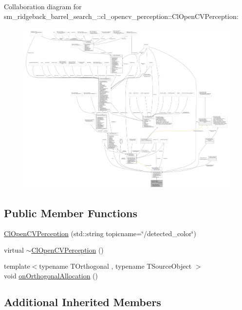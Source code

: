 Collaboration diagram for sm\+\_\+ridgeback\+\_\+barrel\+\_\+search\+\_\+:\+:cl\+\_\+opencv\+\_\+perception\+:\+:Cl\+Open\+C\+V\+Perception\+:
\nopagebreak
\begin{figure}[H]
\begin{center}
\leavevmode
\includegraphics[width=350pt]{classsm__ridgeback__barrel__search__2_1_1cl__opencv__perception_1_1ClOpenCVPerception__coll__graph}
\end{center}
\end{figure}
\subsection*{Public Member Functions}
\begin{DoxyCompactItemize}
\item 
\hyperlink{classsm__ridgeback__barrel__search__2_1_1cl__opencv__perception_1_1ClOpenCVPerception_a6bd2c8bc8b41ddebc23d2f565be5d741}{Cl\+Open\+C\+V\+Perception} (std\+::string topicname=\char`\"{}/detected\+\_\+color\char`\"{})
\item 
virtual \hyperlink{classsm__ridgeback__barrel__search__2_1_1cl__opencv__perception_1_1ClOpenCVPerception_a73b5431ad0983e7daccc7a9d39e46a2b}{$\sim$\+Cl\+Open\+C\+V\+Perception} ()
\item 
{\footnotesize template$<$typename T\+Orthogonal , typename T\+Source\+Object $>$ }\\void \hyperlink{classsm__ridgeback__barrel__search__2_1_1cl__opencv__perception_1_1ClOpenCVPerception_a7e1e4c8938f8e654446843ff0e76273f}{on\+Orthogonal\+Allocation} ()
\end{DoxyCompactItemize}
\subsection*{Additional Inherited Members}


